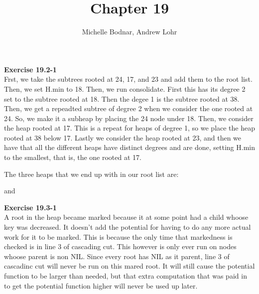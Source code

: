 \documentclass{article}
\title{Chapter 19}
\author{Michelle Bodnar, Andrew Lohr}
\begin{document}
\maketitle


\noindent\textbf{Exercise 19.2-1}\\

Frst, we take the subtrees rooted at 24, 17, and 23 and add them to the root list. Then, we set H.min to 18. Then, we run consolidate. First this has its degree 2 set to the subtree rooted at 18. Then the degee 1 is the subtree rooted at 38. Then, we get a repeadted subtree of degree 2 when we consider the one rooted at 24. So, we make it a subheap by placing the 24 node under 18. Then, we consider the heap rooted at 17. This is a repeat for heaps of degree 1, so we place the heap rooted at 38 below 17. Lastly we consider the heap rooted at 23, and then we have that all the different heaps have distinct degrees and are done, setting H.min to the smallest, that is, the one rooted at 17.

The three heaps that we end up with in our root list are:



and


\noindent\textbf{Exercise 19.3-1}\\

A root in the heap became marked because it at some point had a child whoose key was decreased. It doesn't add the potential for having to do any more actual work for it to be marked. This is because the only time that markedness is checked is in line 3 of cascading cut. This however is only ever run on nodes whoose parent is non NIL. Since every root has NIL as it parent, line 3 of cascadinc cut will never be run on this mared root. It will still cause the potential function to be larger than needed, but that extra computation that was paid in to get the potential function higher will never be used up later.\\
\end{document}
